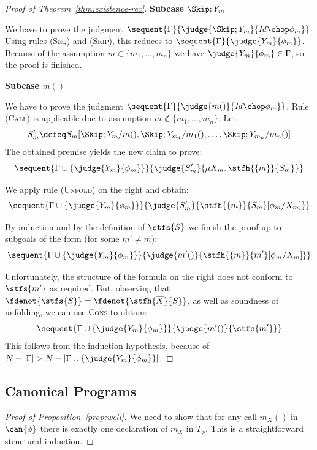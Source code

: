 \documentclass[a4paper,numberwithinsect]{lipics-v2021}
\begin{document}
\begin{proof}[Proof of Theorem~\ref{thm:existence-rec}]
  \noindent\textbf{Subcase $\Skip;Y_m$} 

  We have to prove the judgment
  $\sequent{\Gamma}{\judge{\Skip;Y_m}{\mathit{Id} \chop \phi_m}}$.
  Using rules (\textsc{Seq}) and (\textsc{Skip}), this reduces to
  $\sequent{\Gamma}{\judge{Y_m}{\phi_m}}$.  Because of the assumption
  $m\in\{m_1,\ldots,m_n\}$ we have $\judge{Y_m}{\phi_m}\in\Gamma$, so
  the proof is finished.
  
  \noindent\textbf{Subcase $m()$}

  We have to prove the judgment
  $\sequent{\Gamma}{\judge{m()}{\mathit{Id}\chop\phi_m}}$.  Rule
  (\textsc{Call}) is applicable due to assumption
  $m\not\in\{m_1,\ldots,m_n\}$.
  Let
  \[
    S_m'\defeq S_m[\Skip;Y_m/m(),\Skip;Y_{m_1}/m_1(),\ldots,\Skip;Y_{m_n}/m_n()]
  \]
  The obtained premise yields the new claim to prove:
  \[
    \sequent{\Gamma\cup\{\judge{Y_m}{\phi_m}\}}{\judge{S_m'}{\mu
        X_m.\,\stfh{\{m\}}{S_m}}}
  \]

  We apply rule (\textsc{Unfold}) on the right and obtain:
  \[
    \sequent{\Gamma\cup\{\judge{Y_m}{\phi_m}\}}{\judge{S_m'}{\stfh{\{m\}}{S_m}[\phi_m/X_m]}}
  \]

  By induction and by the definition of $\stfs{S}$ we finish the proof
  up to subgoals of the form (for some $m'\neq m$):
  \[
    \sequent{\Gamma\cup\{\judge{Y_m}{\phi_m}\}}{\judge{m'()}{\stfh{\{m\}}{m'}[\phi_m/X_m]}}
  \]
  
  Unfortunately, the structure of the formula on the right does not
  conform to $\stfs{m'}$ as required.
  But, observing that
  $\fdenot{\stfs{S}} = \fdenot{\stfh{\overline{X}}{S}}$,
  as well as soundness of unfolding, we can use \textsc{Cons} to
  obtain:
  \[
    \sequent{\Gamma\cup\{\judge{Y_m}{\phi_m}\}}{\judge{m'()}{\stfs{m'}}}
  \]  
  This follows from the induction hypothesis, because of
  $N-\left|\Gamma\right|>N-\left|\Gamma\cup\{\judge{Y_m}{\phi_m}\}\right|$.

\end{proof}

\subsection{Canonical Programs}
\label{sec:canonical-programs-app}

\begin{proof}[Proof of Proposition~\ref{prop:well}]
  We need to show that for any call $m_X()$ in $\can{\phi}$ there is
  exactly one declaration of $m_X$ in $T_\phi$. This is a
  straightforward structural induction. %
\end{proof}
\end{document}
